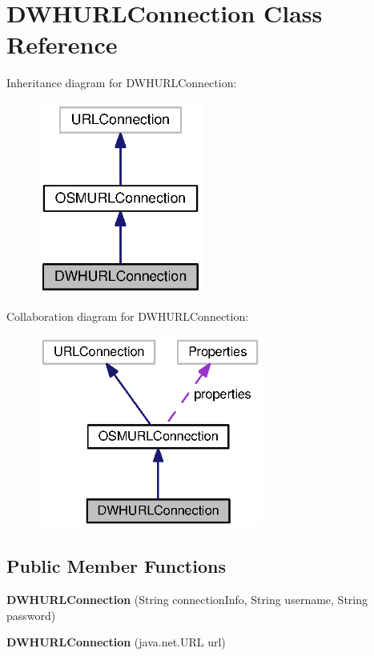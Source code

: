 \section{D\+W\+H\+U\+R\+L\+Connection Class Reference}
\label{classorg_1_1smallfoot_1_1parser_1_1ocidwh_1_1DWHURLConnection}


Inheritance diagram for D\+W\+H\+U\+R\+L\+Connection\+:\nopagebreak
\begin{figure}[H]
\begin{center}
\leavevmode
\includegraphics[width=154pt]{classorg_1_1smallfoot_1_1parser_1_1ocidwh_1_1DWHURLConnection__inherit__graph}
\end{center}
\end{figure}


Collaboration diagram for D\+W\+H\+U\+R\+L\+Connection\+:
\nopagebreak
\begin{figure}[H]
\begin{center}
\leavevmode
\includegraphics[width=209pt]{classorg_1_1smallfoot_1_1parser_1_1ocidwh_1_1DWHURLConnection__coll__graph}
\end{center}
\end{figure}
\subsection*{Public Member Functions}
\begin{DoxyCompactItemize}
\item 
{\bf D\+W\+H\+U\+R\+L\+Connection} (String connection\+Info, String username, String password)
\item 
{\bf D\+W\+H\+U\+R\+L\+Connection} (java.\+net.\+U\+R\+L url)
\end{DoxyCompactItemize}
